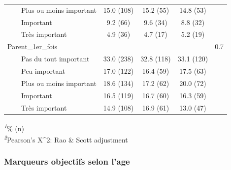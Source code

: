 \documentclass[
]{article}
\begin{document}
\begin{table}[!t]
\begin{tabular*}{\linewidth}{@{\extracolsep{\fill}}lcccc}
    Plus ou moins important & 15.0 (108) & 15.2 (55) & 14.8 (53) &  \\ 
    Important & 9.2 (66) & 9.6 (34) & 8.8 (32) &  \\ 
    Très important & 4.9 (36) & 4.7 (17) & 5.2 (19) &  \\ 
Parent\_1er\_fois &  &  &  & 0.7 \\ 
    Pas du tout important & 33.0 (238) & 32.8 (118) & 33.1 (120) &  \\ 
    Peu important & 17.0 (122) & 16.4 (59) & 17.5 (63) &  \\ 
    Plus ou moins important & 18.6 (134) & 17.2 (62) & 20.0 (72) &  \\ 
    Important & 16.5 (119) & 16.7 (60) & 16.3 (59) &  \\ 
    Très important & 14.9 (108) & 16.9 (61) & 13.0 (47) &  \\ 
\bottomrule
\end{tabular*}
\begin{minipage}{\linewidth}
\textsuperscript{\textit{1}}\% (n)\\
\textsuperscript{\textit{2}}Pearson's X\^{}2: Rao \& Scott adjustment\\
\end{minipage}
\end{table}

\hypertarget{marqueurs-objectifs-selon-lage}{%
\subsubsection{Marqueurs objectifs selon
l'age}\label{marqueurs-objectifs-selon-lage}}
\end{document}
